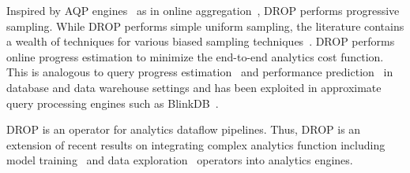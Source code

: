 
Inspired by AQP engines~\cite{barzan-keynote}
as in online aggregation~\cite{onlineagg}, DROP performs progressive
sampling.  
While DROP performs simple uniform sampling, the literature contains a wealth of techniques for various biased sampling techniques~\cite{surajit-sample, surajit-2}.
DROP performs online progress estimation to minimize the
end-to-end analytics cost function. This is analogous to query
progress estimation~\cite{qpi1} and performance
prediction~\cite{mr-predict} in database and data
warehouse settings and has been exploited in approximate query
processing engines such as BlinkDB~\cite{blinkdb}. 

 DROP is an operator
for analytics dataflow pipelines. Thus, DROP is
an extension of recent results on integrating complex
analytics function including model training~\cite{bismarck,mcdb,mlbase} and
data exploration~\cite{scorpion,canopy,kraska-viz} operators into analytics engines. 
